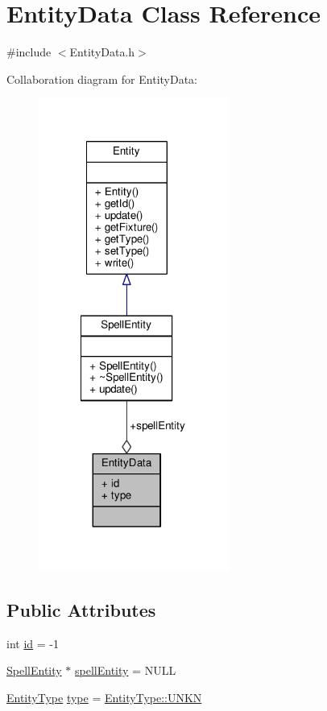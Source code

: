 \hypertarget{class_entity_data}{\section{Entity\-Data Class Reference}
\label{class_entity_data}
}


{\ttfamily \#include $<$Entity\-Data.\-h$>$}



Collaboration diagram for Entity\-Data\-:
\nopagebreak
\begin{figure}[H]
\begin{center}
\leavevmode
\includegraphics[width=177pt]{class_entity_data__coll__graph}
\end{center}
\end{figure}
\subsection*{Public Attributes}
\begin{DoxyCompactItemize}
\item 
int \hyperlink{class_entity_data_a49d6424bb8ad0b6c6008a54d26ff7b93}{id} = -\/1
\item 
\hyperlink{class_spell_entity}{Spell\-Entity} $\ast$ \hyperlink{class_entity_data_a5c2ab0f4236334b63ebd90800aa07e03}{spell\-Entity} = N\-U\-L\-L
\item 
\hyperlink{_entity_type_8h_ad79a57ed3105eb60d991a1aeb4a9dc44}{Entity\-Type} \hyperlink{class_entity_data_ac1f27faa5c0699cc2e084c92f3cf8c46}{type} = \hyperlink{_entity_type_8h_ad79a57ed3105eb60d991a1aeb4a9dc44ac2d5487b54b817fb8fa52b6b19422335}{Entity\-Type\-::\-U\-N\-K\-N}
\end{DoxyCompactItemize}



